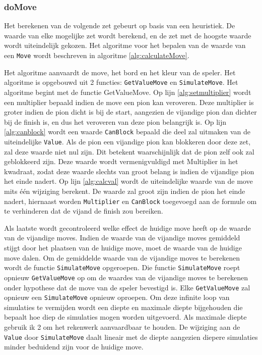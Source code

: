 \documentclass{article}
\begin{document}
\subsubsection{doMove}
Het berekenen van de volgende zet gebeurt op basis van een heuristiek. De waarde van elke mogelijke zet wordt berekend, en de zet met de hoogste waarde wordt uiteindelijk gekozen. 
Het algoritme voor het bepalen van de waarde van een \texttt{Move} wordt beschreven in algoritme \ref{alg:calculateMove}. 

Het algoritme aanvaardt de move, het bord en het kleur van de speler.
Het algoritme is opgebouwd uit 2 functies: \texttt{GetValueMove} en \texttt{SimulateMove}. Het algoritme begint met de functie GetValueMove. Op lijn \ref{alg:setmultiplier} wordt een multiplier bepaald indien de move een pion kan veroveren. Deze multiplier is groter indien de pion dicht is bij de start, aangezien de vijandige pion dan dichter bij de finish is, en dus het veroveren van deze pion belangrijk is. Op lijn \ref{alg:canblock} wordt een waarde \texttt{CanBlock} bepaald die deel zal uitmaken van de uiteindelijke \texttt{Value}. Als de pion een vijandige pion kan blokkeren door deze zet, zal deze waarde niet nul zijn. Dit betekent waarschijnlijk dat de pion zelf ook zal geblokkeerd zijn. Deze waarde wordt vermenigvuldigd met Multiplier in het kwadraat, zodat deze waarde slechts van groot belang is indien de vijandige pion het einde nadert. Op lijn \ref{alg:calcval} wordt de uiteindelijke waarde van de move mits één wijziging berekent. De waarde zal groot zijn indien de pion het einde nadert, hiernaast worden \texttt{Multiplier} en \texttt{CanBlock} toegevoegd aan de formule om te verhinderen dat de vijand de finish zou bereiken. 

Als laatste wordt gecontroleerd welke effect de huidige move heeft op de waarde van de vijandige moves. Indien de waarde van de vijandige moves gemiddeld stijgt door het plaatsen van de huidige move, moet de waarde van de huidige move dalen. Om de gemiddelde waarde van de vijandige moves te berekenen wordt de functie \texttt{SimulateMove} opgeroepen. Die functie \texttt{SimulateMove} roept opnieuw \texttt{GetValueMove} op om de waardes van de vijandige moves te berekenen onder hypothese dat de move van de speler bevestigd is. Elke \texttt{GetValueMove} zal opnieuw een \texttt{SimulateMove} opnieuw oproepen. Om deze infinite loop van simulaties te vermijden wordt een diepte en maximale diepte bijgehouden die bepaalt hoe diep de simulaties mogen worden uitgevoerd. Als maximale diepte gebruik ik 2 om het rekenwerk aanvaardbaar te houden. 
De wijziging aan de \texttt{Value} door \texttt{SimulateMove} daalt lineair met de diepte aangezien diepere simulaties minder beduidend zijn voor de huidige move. 
\end{document}
